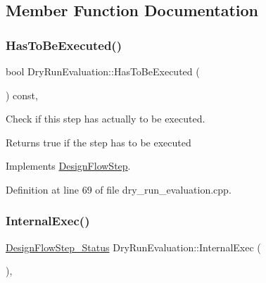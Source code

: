 \subsection{Member Function Documentation}
\mbox{\label{classDryRunEvaluation_a57360a240bb8752db568be9228abaf58}} 
\subsubsection{\texorpdfstring{Has\+To\+Be\+Executed()}{HasToBeExecuted()}}
{\footnotesize\ttfamily bool Dry\+Run\+Evaluation\+::\+Has\+To\+Be\+Executed (\begin{DoxyParamCaption}{ }\end{DoxyParamCaption}) const\hspace{0.3cm}{\ttfamily [override]}, {\ttfamily [virtual]}}



Check if this step has actually to be executed. 

\begin{DoxyReturn}{Returns}
true if the step has to be executed 
\end{DoxyReturn}


Implements \hyperlink{classDesignFlowStep_a1783abe0c1d162a52da1e413d5d1ef05}{Design\+Flow\+Step}.



Definition at line 69 of file dry\+\_\+run\+\_\+evaluation.\+cpp.

\mbox{\label{classDryRunEvaluation_ac02b87b6c4472543d68a1d41acb2404a}} 
\subsubsection{\texorpdfstring{Internal\+Exec()}{InternalExec()}}
{\footnotesize\ttfamily \hyperlink{design__flow__step_8hpp_afb1f0d73069c26076b8d31dbc8ebecdf}{Design\+Flow\+Step\+\_\+\+Status} Dry\+Run\+Evaluation\+::\+Internal\+Exec (\begin{DoxyParamCaption}{ }\end{DoxyParamCaption})\hspace{0.3cm}{\ttfamily [override]}, {\ttfamily [virtual]}}



